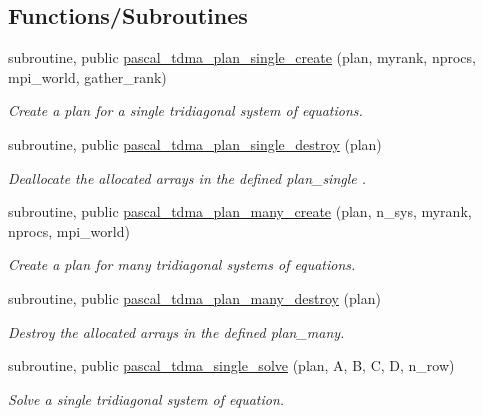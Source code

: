 \subsection*{Functions/\+Subroutines}
\begin{DoxyCompactItemize}
\item 
subroutine, public \mbox{\hyperlink{namespacepascal__tdma_a5dfc2d7c919b47ad364a74d141532a9f}{pascal\+\_\+tdma\+\_\+plan\+\_\+single\+\_\+create}} (plan, myrank, nprocs, mpi\+\_\+world, gather\+\_\+rank)
\begin{DoxyCompactList}\small\item\em Create a plan for a single tridiagonal system of equations. \end{DoxyCompactList}\item 
subroutine, public \mbox{\hyperlink{namespacepascal__tdma_adb04e59c740ce6c4b9518dd86eaeb594}{pascal\+\_\+tdma\+\_\+plan\+\_\+single\+\_\+destroy}} (plan)
\begin{DoxyCompactList}\small\item\em Deallocate the allocated arrays in the defined plan\+\_\+single . \end{DoxyCompactList}\item 
subroutine, public \mbox{\hyperlink{namespacepascal__tdma_a7e9c24b343ae949044eccc8692dcc6e9}{pascal\+\_\+tdma\+\_\+plan\+\_\+many\+\_\+create}} (plan, n\+\_\+sys, myrank, nprocs, mpi\+\_\+world)
\begin{DoxyCompactList}\small\item\em Create a plan for many tridiagonal systems of equations. \end{DoxyCompactList}\item 
subroutine, public \mbox{\hyperlink{namespacepascal__tdma_a8438e6774617871b147af9ec8bdad6ce}{pascal\+\_\+tdma\+\_\+plan\+\_\+many\+\_\+destroy}} (plan)
\begin{DoxyCompactList}\small\item\em Destroy the allocated arrays in the defined plan\+\_\+many. \end{DoxyCompactList}\item 
subroutine, public \mbox{\hyperlink{namespacepascal__tdma_ab14e132231d4b53fd65dd333ccc85a50}{pascal\+\_\+tdma\+\_\+single\+\_\+solve}} (plan, A, B, C, D, n\+\_\+row)
\begin{DoxyCompactList}\small\item\em Solve a single tridiagonal system of equation. \end{DoxyCompactList}\item 

\end{DoxyCompactItemize}
